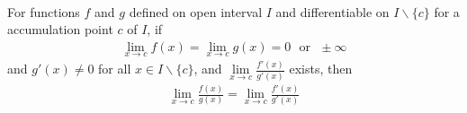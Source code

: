 \begin{theorem}  \\
For functions $f$ and $g$ defined on open interval $I$ and differentiable on $I \backslash \{c\}$ for a accumulation point $c$ of $I$, if
\begin{align}
\lim\limits_{x \rightarrow c} f(x) = \lim\limits_{x \rightarrow c} g(x) = 0 \ \ \ \text{or} \ \ \ \pm \infty \nonumber
\end{align}
and $g'(x) \neq 0$ for all $x \in I \backslash \{ c \}$, and $\lim\limits_{x \rightarrow c} \frac{f'(x)}{g'(x)}$ exists, then
\begin{align}
\lim\limits_{x \rightarrow c} \frac{f(x)}{g(x)} = \lim\limits_{x \rightarrow c} \frac{f'(x)}{g'(x)} \nonumber
\end{align}
\end{theorem}